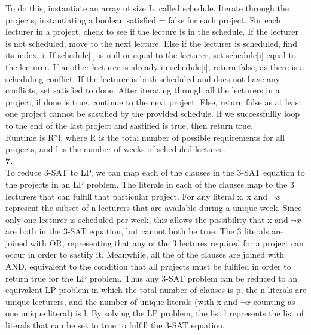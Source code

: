 \documentclass[a4paper,12pt]{article}
\begin{document}
To do this, instantiate an array of size L, called schedule. Iterate through the projects, instantiating a boolean satisfied = false for each project. For each lecturer in a project, check to see if the lecture is in the schedule. If the lecturer is not scheduled, move to the next lecture. Else if the lecturer is scheduled, find its index, i. If schedule[i] is null or equal to the lecturer, set schedule[i] equal to the lecturer. If another lecturer is already in schedule[i], return false, as there is a scheduling conflict. If the lecturer is both scheduled and does not have any conflicts, set satisfied to done. After iterating through all the lecturers in a project, if done is true, continue to the next project. Else, return false as at least one project cannot be sastified by the provided schedule. If we successfullly loop to the end of the last project and sastified is true, then return true.\\

Runtime is R*l, where R is the total number of possible requirements for all projects, and l is the number of weeks of scheduled lectures. \\
\noindent \textbf{7.}\\
To reduce 3-SAT to LP, we can map each of the clauses in the 3-SAT equation to the projects in an LP problem. The literals in each of the clauses map to the 3 lecturers that can fulfill that particular project. For any literal x, x and $\neg x$ represent the subset of n lecturers that are available during a unique week. Since only one lecturer is scheduled per week, this allows the possibility that x and $\neg x$ are both in the 3-SAT equation, but cannot both be true. The 3 literals are joined with OR, representing that any of the 3 lectures required for a project can occur in order to sastify it. Meanwhile, all the of the clauses are joined with AND, equivalent to the condition that all projects must be fulfiled in order to return true for the LP problem. Thus any 3-SAT problem can be reduced to an equivalent LP problem in which the total number of clauses is p, the n literals are unique lecturers, and the number of unique literals (with x and $\neg x$ counting as one unique literal) is l.  By solving the LP problem, the list l represents the list of literals that can be set to true to fulfill the 3-SAT equation.  
\end{document}
